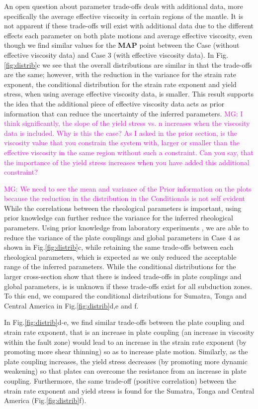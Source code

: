 \documentclass[12pt]{article}
\newcommand{\mgnote}[1]{\textcolor{magenta}{MG: #1}}
\begin{document}
An open question about parameter trade-offs deals with additional data, more specifically the average effective viscosity in certain regions of the mantle. 
It is not apparent if these trade-offs will exist with additional data due to the different effects each parameter on both plate motions and average effective viscosity, even though we find similar values for the \textbf{MAP} point between the Case  (without effective viscosity data) and Case 3 (with effective viscosity data). In Fig.\ref{fig:distrib}c we see that the overall distributions are similar in that the trade-offs are the same; however, with the reduction in the variance for the strain rate exponent, the conditional distribution for the strain rate exponent and yield stress, when using average effective viscosity data, is smaller. This result supports the idea that the additional piece of effective viscosity data acts as prior information that can reduce the uncertainty of the inferred parameters. 
\mgnote{I think significantly, the slope of the yield stress vs. n increases when the viscosity data is included. Why is this the case? As I asked in the prior section, is the viscosity value that you constrain the system with, larger or smaller than the effective viscosity in the same region without such a constraint. Can you say, that the importance of the yield stress increases when you have added this additional constraint?}

\mgnote{We need to see the mean and variance of the Prior information on the plots because the reduction in the distribution in the Conditionals is not self evident}
While the correlations between the rheological parameters is important, using prior knowledge can further reduce the variance for the inferred rheological parameters. Using prior knowledge from laboratory experiments \citep{korenaga2008new}, we are able to reduce the variance of the plate couplings and global parameters in Case 4 as shown in Fig.\ref{fig:distrib}c, while retaining the same trade-offs between each rheological parameters, which is expected as we only reduced the acceptable range of the inferred parameters. While the conditional distributions for the larger cross-section show that there is indeed trade-offs in plate couplings and global parameters, is is unknown if these trade-offs exist for all subduction zones. To this end, we compared the conditional distributions for Sumatra, Tonga and Central America in Fig.\ref{fig:distrib}d,e and f. 


In Fig.\ref{fig:distrib}d-e, we find similar trade-offs between the plate coupling and strain rate exponent, that is an increase in plate coupling (an increase in viscosity within the fault zone) would lead to an increase in the strain rate exponent (by promoting more shear thinning) so as to increase plate motion. Similarly, as the plate coupling increases, the yield stress decreases (by promoting more dynamic weakening) so that plates can overcome the resistance from an increase in plate coupling. Furthermore, the same trade-off (positive correlation) between the strain rate exponent and yield stress is found for the Sumatra, Tonga and Central America (Fig.\ref{fig:distrib}f). 
\end{document}
